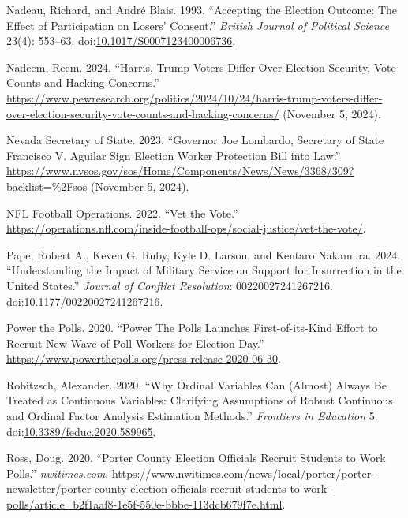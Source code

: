 \documentclass[
  12pt,
  letterpaper,
]{article}
\newlength{\cslhangindent}
\newenvironment{CSLReferences}[2] %
 {\begin{list}{}{%
  \setlength{\itemindent}{0pt}
  \setlength{\leftmargin}{0pt}
  \setlength{\parsep}{0pt}
  \ifodd #1
   \setlength{\leftmargin}{\cslhangindent}
   \setlength{\itemindent}{-1\cslhangindent}
  \fi
  \setlength{\itemsep}{#2\baselineskip}}}
 {\end{list}}
\begin{document}
\begin{CSLReferences}{1}{1}
Nadeau, Richard, and André Blais. 1993. {``Accepting the {Election
Outcome}: {The Effect} of {Participation} on {Losers}' {Consent}.''}
\emph{British Journal of Political Science} 23(4): 553--63.
doi:\href{https://doi.org/10.1017/S0007123400006736}{10.1017/S0007123400006736}.

Nadeem, Reem. 2024. {``Harris, {Trump Voters Differ Over Election
Security}, {Vote Counts} and {Hacking Concerns}.''}
\url{https://www.pewresearch.org/politics/2024/10/24/harris-trump-voters-differ-over-election-security-vote-counts-and-hacking-concerns/}
(November 5, 2024).

Nevada Secretary of State. 2023. {``Governor {Joe Lombardo}, {Secretary}
of {State Francisco V}. {Aguilar} Sign {Election Worker Protection Bill}
into Law.''}
\url{https://www.nvsos.gov/sos/Home/Components/News/News/3368/309?backlist=\%2Fsos}
(November 5, 2024).

NFL Football Operations. 2022. {``Vet the {Vote}.''}
\url{https://operations.nfl.com/inside-football-ops/social-justice/vet-the-vote/}.

Pape, Robert A., Keven G. Ruby, Kyle D. Larson, and Kentaro Nakamura.
2024. {``Understanding the {Impact} of {Military Service} on {Support}
for {Insurrection} in the {United States}.''} \emph{Journal of Conflict
Resolution}: 00220027241267216.
doi:\href{https://doi.org/10.1177/00220027241267216}{10.1177/00220027241267216}.

Power the Polls. 2020. {``Power {The Polls Launches First-of-its-Kind
Effort} to {Recruit New Wave} of {Poll Workers} for {Election Day}.''}
\url{https://www.powerthepolls.org/press-release-2020-06-30}.

Robitzsch, Alexander. 2020. {``Why {Ordinal Variables Can} ({Almost})
{Always Be Treated} as {Continuous Variables}: {Clarifying Assumptions}
of {Robust Continuous} and {Ordinal Factor Analysis Estimation
Methods}.''} \emph{Frontiers in Education} 5.
doi:\href{https://doi.org/10.3389/feduc.2020.589965}{10.3389/feduc.2020.589965}.

Ross, Doug. 2020. {``Porter {County} Election Officials Recruit Students
to Work Polls.''} \emph{nwitimes.com}.
\url{https://www.nwitimes.com/news/local/porter/porter-newsletter/porter-county-election-officials-recruit-students-to-work-polls/article_b2f1aaf8-1e5f-550e-bbbe-113dcb679f7e.html}.


\end{CSLReferences}
\end{document}

